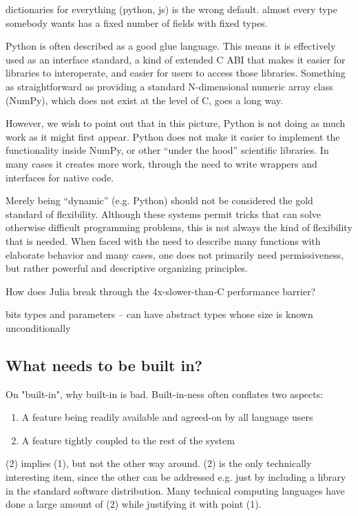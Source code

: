{dictionaries for everything (python, js) is the wrong default. almost every
type somebody wants has a fixed number of fields with fixed types.

Python is often described as a good glue language. This
means it is effectively used as an interface standard, a kind of
extended C ABI that makes it easier for libraries to interoperate,
and easier for users to access those libraries. Something as straightforward
as providing a standard N-dimensional numeric array class (NumPy),
which does not exist at the level of C, goes a long way.

However, we wish to point out that in this picture, Python is not
doing as much work as it might first appear. Python does not make
it easier to implement the functionality inside NumPy, or other
``under the hood'' scientific libraries. In many cases it creates
more work, through the need to write wrappers and interfaces
for native code.


Merely being ``dynamic'' (e.g. Python) should not be considered
the gold standard of flexibility. Although these systems permit
tricks that can solve otherwise difficult programming problems,
this is not always the kind of flexibility that is needed.
When faced with the need to describe many functions with elaborate
behavior and many cases, one does not primarily need permissiveness,
but rather powerful and descriptive organizing principles.



How does Julia break through the 4x-slower-than-C performance barrier?

bits types and parameters -- can have abstract types whose size is known
unconditionally




\subsection{What needs to be built in?}

On "built-in", why built-in is bad. Built-in-ness often conflates two
aspects:

\begin{enumerate}
\item A feature being readily available and agreed-on by all language users
\item A feature tightly coupled to the rest of the system
\end{enumerate}

(2) implies (1), but not the other way around. (2) is the only technically
interesting item, since the other can be addressed e.g. just by including
a library in the standard software distribution. Many technical computing
languages have done a large amount of (2) while justifying it with point (1).



}
